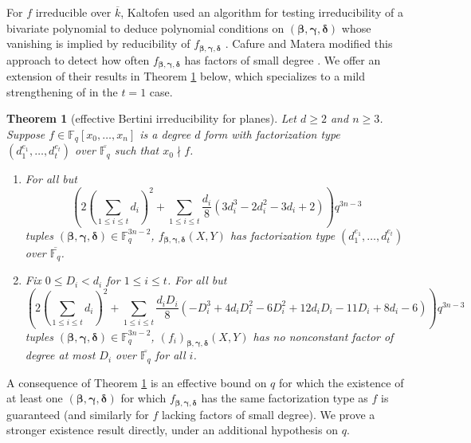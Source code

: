 \documentclass{amsart}
\newcommand{\F}{\mathbb{F}}
\renewcommand{\v}{\beta}
\newcommand{\w}{\gamma}
\newcommand{\z}{\delta}
\newcommand{\bv}{\boldsymbol{\v}}
\newcommand{\bw}{\boldsymbol{\w}}
\newcommand{\bz}{\boldsymbol{\z}}
\newcommand{\fvwz}{f_{\bv, \bw, \bz}}
\newtheorem{theorem}{Theorem}[section]
\theoremstyle{definition}
\numberwithin{equation}{section}
\numberwithin{table}{section}
\begin{document}
For $f$ irreducible over $\overline{k}$, %
Kaltofen used an algorithm for testing irreducibility of a bivariate polynomial to deduce polynomial conditions on $(\bv,\bw,\bz)$ whose vanishing is implied by reducibility of $\fvwz$ \cite{Kaltofen}. Cafure and Matera modified this approach to detect how often $\fvwz$ has factors of small degree \cite{CafureMatera}. We offer an extension of their results in Theorem \ref{thm:effBertini} below, which specializes to a mild strengthening of \cite[Corollaries 3.2, 3.4]{CafureMatera} in the $t=1$ case.

\begin{theorem}[effective Bertini irreducibility for planes]
\label{thm:effBertini}
	Let $d \geq 2$ and $n \geq 3$. Suppose $f \in \F_q[x_0,\ldots,x_n]$ is a degree $d$ form with factorization type $(d_1^{e_1},\ldots,d_t^{e_t})$ over $\overline{\F_q}$ such that $x_0 \nmid f$.
	\begin{enumerate}[label = (\roman*)]
		\item For all but
		\[\left(2\left(\sum_{1 \leq i \leq t} d_i \right)^2 + \sum_{1 \leq i \leq t} \frac{d_i}{8}\left(3d_i^3 - 2d_i^2 - 3d_i + 2\right) \right)q^{3n-3}\]
		tuples $(\bv,\bw,\bz) \in \F_q^{3n-2}$, $\fvwz(X,Y)$ has factorization type $(d_1^{e_1},\ldots,d_t^{e_t})$ over $\overline{\F_q}$.
		
		\item Fix $0 \leq D_i < d_i$ for $1 \leq i \leq t$. For all but
		\[\left(2\left(\sum_{1 \leq i \leq t} d_i \right)^2 + \sum_{1 \leq i \leq t} \frac{d_iD_i}{8}\left(-D_i^3 + 4d_iD_i^2 - 6D_i^2 + 12d_iD_i - 11D_i + 8d_i - 6\right) \right)q^{3n-3}\]
		tuples $(\bv,\bw,\bz) \in \F_q^{3n-2}$, $(f_i)_{\bv,\bw,\bz}(X,Y)$ has no nonconstant factor of degree at most $D_i$ over $\overline{\F_q}$ for all $i$.
	\end{enumerate}
\end{theorem}

A consequence of Theorem \ref{thm:effBertini} is an effective bound on $q$ for which the existence of at least one $(\bv,\bw,\bz)$ for which $\fvwz$ has the same factorization type as $f$ is guaranteed (and similarly for $f$ lacking factors of small degree). We prove a stronger existence result  directly, under an additional hypothesis on $q$.
\end{document}
